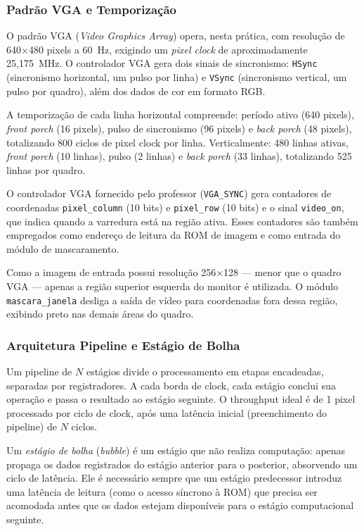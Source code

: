 \documentclass[12pt, a4paper]{article}
\begin{document}
	\subsubsection{Padrão VGA e Temporização}
	
	O padrão VGA (\textit{Video Graphics Array}) opera, nesta prática, com resolução
	de 640$\times$480 pixels a 60~Hz, exigindo um \textit{pixel clock} de
	aproximadamente 25,175~MHz. O controlador VGA gera dois sinais de sincronismo:
	\texttt{HSync} (sincronismo horizontal, um pulso por linha) e \texttt{VSync}
	(sincronismo vertical, um pulso por quadro), além dos dados de cor em formato
	RGB.
	
	A temporização de cada linha horizontal compreende: período ativo (640 pixels),
	\textit{front porch} (16 pixels), pulso de sincronismo (96 pixels) e
	\textit{back porch} (48 pixels), totalizando 800 ciclos de pixel clock por linha.
	Verticalmente: 480 linhas ativas, \textit{front porch} (10 linhas), pulso (2
	linhas) e \textit{back porch} (33 linhas), totalizando 525 linhas por quadro.
	
	O controlador VGA fornecido pelo professor (\texttt{VGA\_SYNC}) gera contadores
	de coordenadas \texttt{pixel\_column} (10 bits) e \texttt{pixel\_row} (10 bits)
	e o sinal \texttt{video\_on}, que indica quando a varredura está na região ativa.
	Esses contadores são também empregados como endereço de leitura da ROM de imagem
	e como entrada do módulo de mascaramento.
	
	Como a imagem de entrada possui resolução 256$\times$128 --- menor que o quadro
	VGA --- apenas a região superior esquerda do monitor é utilizada. O módulo
	\texttt{mascara\_janela} desliga a saída de vídeo para coordenadas fora dessa
	região, exibindo preto nas demais áreas do quadro.
	
	\subsubsection{Arquitetura Pipeline e Estágio de Bolha}
	
	Um pipeline de $N$ estágios divide o processamento em etapas encadeadas,
	separadas por registradores. A cada borda de clock, cada estágio conclui sua
	operação e passa o resultado ao estágio seguinte. O throughput ideal é de 1 pixel
	processado por ciclo de clock, após uma latência inicial (preenchimento do
	pipeline) de $N$ ciclos.
	
	Um \textit{estágio de bolha} (\textit{bubble}) é um estágio que não realiza
	computação: apenas propaga os dados registrados do estágio anterior para o
	posterior, absorvendo um ciclo de latência. Ele é necessário sempre que um
	estágio predecessor introduz uma latência de leitura (como o acesso síncrono à
	ROM) que precisa ser acomodada antes que os dados estejam disponíveis para o
	estágio computacional seguinte.
	
\end{document}
